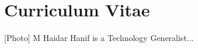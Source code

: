 
\thispagestyle{empty}

\chapter*{Curriculum Vitae}
\label{chap:cv}

[Photo] M Haidar Hanif is a Technology Generalist...

